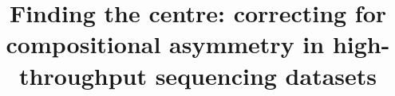 \documentclass{bmcart}
\begin{document}
\begin{frontmatter}

\begin{fmbox}


\title{Finding the centre: correcting for compositional asymmetry in high-throughput sequencing datasets}


\author[
   addressref={aff1},                   %
   email={jr2wu@uwaterloo.ca}   %
]{ }
\author[
   addressref={aff2},                   %
   email={jean.macklaim@gmail.com}   %
]{ }
\author[
   addressref={aff2},                   %
   email={bgenge3@gmail.com}   %
]{ }
\author[
   addressref={aff2},
   corref={aff1},
   email={ggloor@uwo.ca}
]{ }



\end{fmbox}
\end{frontmatter}
\end{document}
